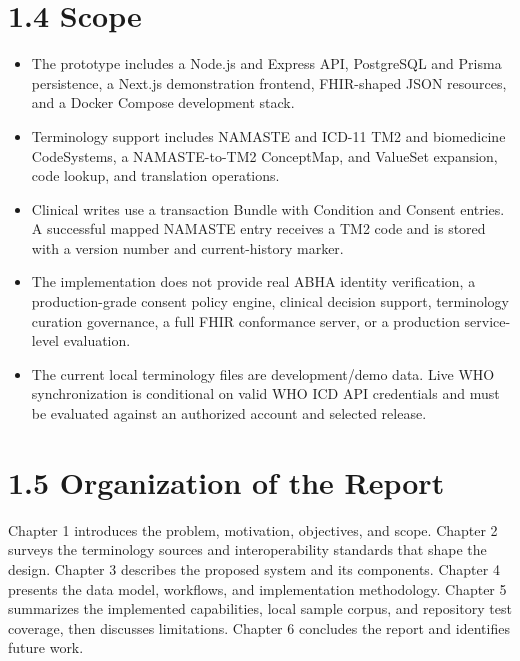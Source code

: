 \documentclass[12pt,a4paper,oneside]{report}
\begin{document}
\section*{1.4 Scope}
\begin{itemize}
\item The prototype includes a Node.js and Express API, PostgreSQL and Prisma persistence, a Next.js demonstration frontend, FHIR-shaped JSON resources, and a Docker Compose development stack.
\item Terminology support includes NAMASTE and ICD-11 TM2 and biomedicine CodeSystems, a NAMASTE-to-TM2 ConceptMap, and ValueSet expansion, code lookup, and translation operations.
\item Clinical writes use a transaction Bundle with Condition and Consent entries. A successful mapped NAMASTE entry receives a TM2 code and is stored with a version number and current-history marker.
\item The implementation does not provide real ABHA identity verification, a production-grade consent policy engine, clinical decision support, terminology curation governance, a full FHIR conformance server, or a production service-level evaluation.
\item The current local terminology files are development/demo data. Live WHO synchronization is conditional on valid WHO ICD API credentials and must be evaluated against an authorized account and selected release.
\end{itemize}
\section*{1.5 Organization of the Report}
Chapter 1 introduces the problem, motivation, objectives, and scope. Chapter 2 surveys the terminology sources and interoperability standards that shape the design. Chapter 3 describes the proposed system and its components. Chapter 4 presents the data model, workflows, and implementation methodology. Chapter 5 summarizes the implemented capabilities, local sample corpus, and repository test coverage, then discusses limitations. Chapter 6 concludes the report and identifies future work.
\end{document}

